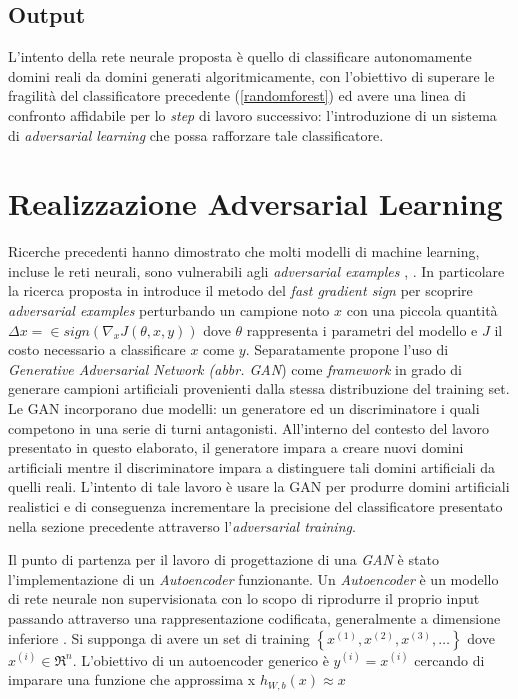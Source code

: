\subsection{Output}
\label{classificatorennoutput}
L'intento della rete neurale proposta è quello di classificare autonomamente domini reali da domini generati algoritmicamente, con l'obiettivo di superare le fragilità del classificatore precedente (\ref{randomforest}) ed avere una linea di confronto affidabile per lo \textit{step} di lavoro successivo: l'introduzione di un sistema di \textit{adversarial learning} che possa rafforzare tale classificatore. 

\section{Realizzazione Adversarial Learning}
\label{adv}
Ricerche precedenti hanno dimostrato che molti modelli di machine learning, incluse le reti neurali, sono vulnerabili agli \textit{adversarial examples} \cite{1312.6199},  \cite{1412.6572} . In particolare la ricerca proposta in \cite{1412.6572} introduce il metodo del \textit{fast gradient sign} per scoprire \textit{adversarial examples} perturbando un campione noto $x$ con una piccola quantità $\Delta x =  \in sign(\nabla_x J(\theta,x,y))$ dove $\theta$ rappresenta i parametri del modello e $J$ il costo necessario a classificare $x$ come $y$.
Separatamente \cite{1406.2661} propone l'uso di \textit{Generative Adversarial Network (abbr. GAN})  come \textit{framework} in grado di generare campioni artificiali provenienti dalla stessa distribuzione del training set.
Le GAN incorporano due modelli: un generatore ed un discriminatore i quali competono in una serie di turni antagonisti. All'interno del contesto del lavoro presentato in questo elaborato, il generatore impara a creare nuovi domini artificiali mentre il discriminatore impara a distinguere tali domini artificiali da quelli reali. L'intento di tale lavoro è usare la GAN per produrre domini artificiali realistici e di conseguenza incrementare la precisione del classificatore presentato nella sezione precedente attraverso l'\textit{adversarial training}.

Il punto di partenza per il lavoro di progettazione di una \textit{GAN} è stato l'implementazione di un \textit{Autoencoder} funzionante.  Un \textit{Autoencoder} è un modello di rete neurale non supervisionata con lo scopo di riprodurre il proprio input passando attraverso una rappresentazione codificata, generalmente a dimensione inferiore\cite{MAL-006} \cite{Liou:2008:MWP:1411851.1412074}. Si supponga di avere un set di training $\left\{ x^{(1)}, x^{(2)}, x^{(3)}, \ldots \right\}$ dove $x^{(i)} \in \Re^n$. L'obiettivo di un autoencoder generico è $y^{(i)} = x^{(i)}$ cercando di imparare una funzione che approssima x $h_{W,b}(x) \approx x$

